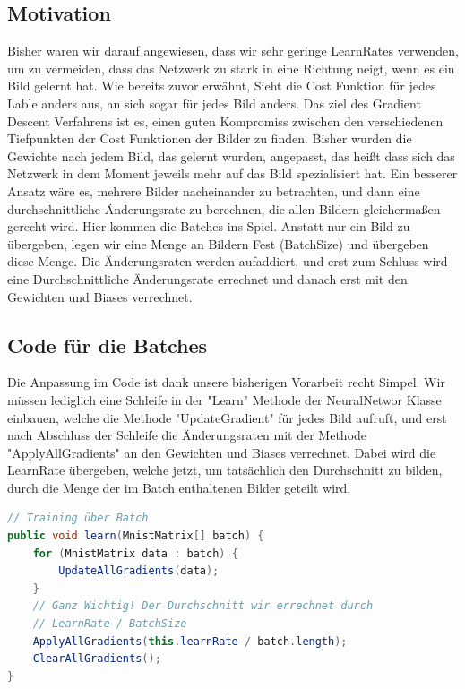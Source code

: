 \documentclass[12pt]{article}
\begin{document}
\subsection{Motivation}
Bisher waren wir darauf angewiesen, dass wir sehr geringe LearnRates verwenden, um zu vermeiden, dass das Netzwerk zu stark in eine Richtung neigt, wenn es ein Bild gelernt hat. Wie bereits zuvor erwähnt, Sieht die Cost Funktion für jedes Lable anders aus, an sich sogar für jedes Bild anders. Das ziel des Gradient Descent Verfahrens ist es, einen guten Kompromiss zwischen den verschiedenen Tiefpunkten der Cost Funktionen der Bilder zu finden.
Bisher wurden die Gewichte nach jedem Bild, das gelernt wurden, angepasst, das heißt dass sich das Netzwerk in dem Moment jeweils mehr auf das Bild spezialisiert hat. Ein besserer Ansatz wäre es, mehrere Bilder nacheinander zu betrachten, und dann eine durchschnittliche Änderungsrate zu berechnen, die allen Bildern gleichermaßen gerecht wird. Hier kommen die Batches ins Spiel.
Anstatt nur ein Bild zu übergeben, legen wir eine Menge an Bildern Fest (BatchSize) und übergeben diese Menge. Die Änderungsraten werden aufaddiert, und erst zum Schluss wird eine Durchschnittliche Änderungsrate errechnet und danach erst mit den Gewichten und Biases verrechnet.
\subsection{Code für die Batches}
Die Anpassung im Code ist dank unsere bisherigen Vorarbeit recht Simpel.
Wir müssen lediglich eine Schleife in der "Learn" Methode der NeuralNetwor Klasse einbauen, welche die Methode "UpdateGradient" für jedes Bild aufruft, und erst nach Abschluss der Schleife die Änderungsraten mit der Methode "ApplyAllGradients" an den Gewichten und Biases verrechnet. Dabei wird die LearnRate übergeben, welche jetzt, um tatsächlich den Durchschnitt zu bilden, durch die Menge der im Batch enthaltenen Bilder geteilt wird.\begin{lstlisting}[language=Java]
// Training über Batch
public void learn(MnistMatrix[] batch) {
    for (MnistMatrix data : batch) {
        UpdateAllGradients(data);
    }
    // Ganz Wichtig! Der Durchschnitt wir errechnet durch
    // LearnRate / BatchSize
    ApplyAllGradients(this.learnRate / batch.length);
    ClearAllGradients();
}
\end{lstlisting}
\end{document}
